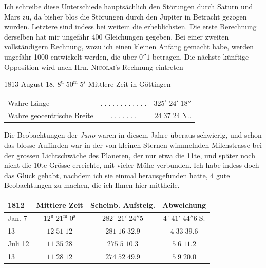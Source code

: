 \par\indent Ich schreibe diese Unterschiede hauptsächlich den Störungen durch Saturn
und Mars zu, da bisher blos die Störungen durch den Jupiter in Betracht
gezogen wurden. Letztere sind indess bei weitem die erheblichsten. Die
erste Berechnung derselben hat mir ungefähr 400 Gleichungen gegeben. Bei
einer zweiten vollständigern Rechnung, wozu ich einen kleinen Anfang
gemacht habe, werden ungefähr 1000 entwickelt werden, die über $0''1$
betragen. Die nächste künftige Opposition wird nach Hrn. \textsc{Nicolai}'s
Rechnung eintreten

1813 August 18. $8^{\mathrm u}\;50^{\mathrm m}\;5^{\mathrm s}$ Mittlere Zeit in Göttingen

\begin{center}\fontsize{10}{12}\selectfont\setlength{\tabcolsep}{2pt}\renewcommand{\arraystretch}{1.15}\begin{tabular}{lcr}
Wahre Länge & $.\;.\;.\;.\;.\;.\;.\;.\;.\;.\;.\;.$ & $325^\circ\;24'\;18''$\\
Wahre geocentrische Breite & $.\;.\;.\;.\;.\;.\;.$ & $24\;37\;24\;\mathrm{N}..$\\
\end{tabular}\end{center}

\par\indent Die Beobachtungen der \emph{Juno} waren in diesem Jahre überaus schwierig,
und schon das blosse Auffinden war in der von kleinen Sternen wimmelnden
Milchstrasse bei der grossen Lichtschwäche des Planeten, der nur etwa die
11te, und später noch nicht die 10te Grösse erreichte, mit vieler Mühe
verbunden. Ich habe indess doch das Glück gehabt, nachdem ich sie einmal
herausgefunden hatte, 4 gute Beobachtungen zu machen, die ich Ihnen hier
mittheile.

\begin{center}\fontsize{10}{12}\selectfont\setlength{\tabcolsep}{4pt}\renewcommand{\arraystretch}{1.15}\begin{tabular}{l|c|c|c}
1812 & Mittlere Zeit & Scheinb. Aufsteig. & Abweichung\\\hline
Jan. 7 & $12^{\mathrm u}\;21^{\mathrm m}\;0^{\mathrm s}$ & $282^\circ\;21'\;24''5$ & $4^\circ\;41'\;44''6\;\mathrm S.$\\
13 & $12\;51\;12$ & $281\;16\;32.9$ & $4\;33\;39.6$\\
Juli 12 & $11\;35\;28$ & $275\;5\;10.3$ & $5\;6\;11.2$\\
13 & $11\;28\;12$ & $274\;52\;49.9$ & $5\;9\;20.0$\\
\end{tabular}\end{center}

